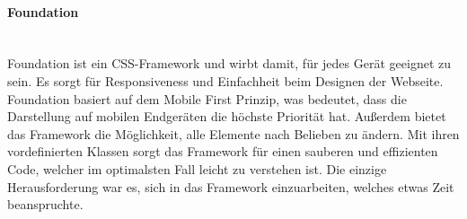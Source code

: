 \paragraph{Foundation} \leavevmode \\
Foundation ist ein CSS-Framework und wirbt damit, für jedes Gerät geeignet zu sein. Es sorgt für Responsiveness und Einfachheit beim Designen der Webseite. Foundation basiert auf dem Mobile First Prinzip, was bedeutet, dass die Darstellung auf mobilen Endgeräten die höchste Priorität hat.   Außerdem bietet das Framework die Möglichkeit, alle Elemente nach Belieben zu ändern. Mit ihren vordefinierten Klassen sorgt das Framework für einen sauberen und effizienten Code, welcher im optimalsten Fall leicht zu verstehen ist. Die einzige Herausforderung war es, sich in das Framework einzuarbeiten, welches etwas Zeit beanspruchte. 
